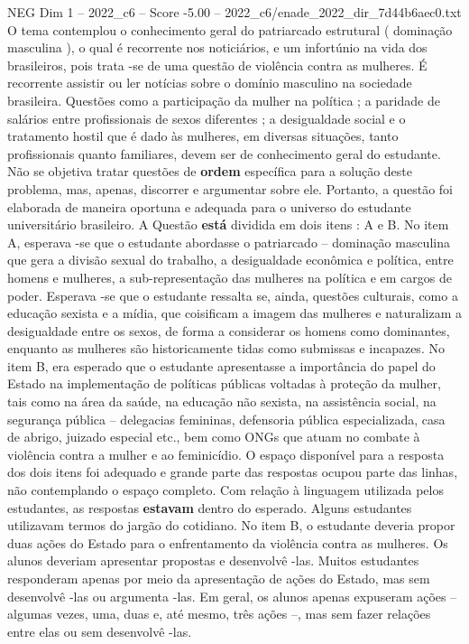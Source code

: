 \begin{textsample}{NEG Dim 1 – 2022\_c6 – Score -5.00 – 2022\_c6/enade\_2022\_dir\_7d44b6aec0.txt}
O tema contemplou o conhecimento geral do patriarcado estrutural ( dominação masculina ), o qual é recorrente nos noticiários, e um infortúnio na vida dos brasileiros, pois trata -se de uma questão de violência contra as mulheres.
É recorrente assistir ou ler notícias sobre o domínio masculino na sociedade brasileira.
Questões como a participação da mulher na política ; a paridade de salários entre profissionais de sexos diferentes ; a desigualdade social e o tratamento hostil que é dado às mulheres, em diversas situações, tanto profissionais quanto familiares, devem ser de conhecimento geral do estudante.
Não se objetiva tratar questões de \textbf{ordem} específica para a solução deste problema, mas, apenas, discorrer e argumentar sobre ele.
Portanto, a questão foi elaborada de maneira oportuna e adequada para o universo do estudante universitário brasileiro.
A Questão \textbf{está} dividida em dois itens : A e B.
No item A, esperava -se que o estudante abordasse o patriarcado – dominação masculina que gera a divisão sexual do trabalho, a desigualdade econômica e política, entre homens e mulheres, a sub-representação das mulheres na política e em cargos de poder.
Esperava -se que o estudante ressalta se, ainda, questões culturais, como a educação sexista e a mídia, que coisificam a imagem das mulheres e naturalizam a desigualdade entre os sexos, de forma a considerar os homens como dominantes, enquanto as mulheres são historicamente tidas como submissas e incapazes.
No item B, era esperado que o estudante apresentasse a importância do papel do Estado na implementação de políticas públicas voltadas à proteção da mulher, tais como na área da saúde, na educação não sexista, na assistência social, na segurança pública – delegacias femininas, defensoria pública especializada, casa de abrigo, juizado especial etc., bem como ONGs que atuam no combate à violência contra a mulher e ao feminicídio.
O espaço disponível para a resposta dos dois itens foi adequado e grande parte das respostas ocupou parte das linhas, não contemplando o espaço completo.
Com relação à linguagem utilizada pelos estudantes, as respostas \textbf{estavam} dentro do esperado.
Alguns estudantes utilizavam termos do jargão do cotidiano.
No item B, o estudante deveria propor duas ações do Estado para o enfrentamento da violência contra as mulheres.
Os alunos deveriam apresentar propostas e desenvolvê -las.
Muitos estudantes responderam apenas por meio da apresentação de ações do Estado, mas sem desenvolvê -las ou argumenta -las.
Em geral, os alunos apenas expuseram ações – algumas vezes, uma, duas e, até mesmo, três ações –, mas sem fazer relações entre elas ou sem desenvolvê -las.

\end{textsample}

